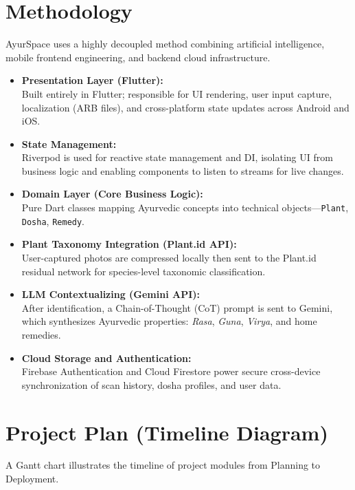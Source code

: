 \section{Methodology}
\justify
AyurSpace uses a highly decoupled method combining artificial intelligence, mobile
frontend engineering, and backend cloud infrastructure.

\begin{itemize}
    \item \textbf{Presentation Layer (Flutter):}\\
    Built entirely in Flutter; responsible for UI rendering, user input capture,
    localization (ARB files), and cross-platform state updates across Android and iOS.

    \item \textbf{State Management:}\\
    Riverpod is used for reactive state management and DI, isolating UI from business
    logic and enabling components to listen to streams for live changes.

    \item \textbf{Domain Layer (Core Business Logic):}\\
    Pure Dart classes mapping Ayurvedic concepts into technical objects---\texttt{Plant},
    \texttt{Dosha}, \texttt{Remedy}.

    \item \textbf{Plant Taxonomy Integration (Plant.id API):}\\
    User-captured photos are compressed locally then sent to the Plant.id residual
    network for species-level taxonomic classification.

    \item \textbf{LLM Contextualizing (Gemini API):}\\
    After identification, a Chain-of-Thought (CoT) prompt is sent to Gemini, which
    synthesizes Ayurvedic properties: \textit{Rasa}, \textit{Guna}, \textit{Virya},
    and home remedies.

    \item \textbf{Cloud Storage and Authentication:}\\
    Firebase Authentication and Cloud Firestore power secure cross-device synchronization
    of scan history, dosha profiles, and user data.
\end{itemize}

\newpage
\section{Project Plan (Timeline Diagram)}
A Gantt chart illustrates the timeline of project modules from Planning to Deployment.

